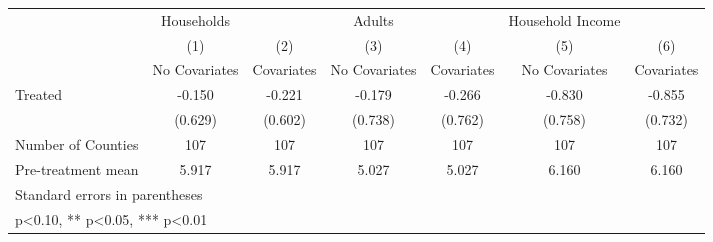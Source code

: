{
\def\sym#1{\ifmmode^{#1}\else\(^{#1}\)\fi}
\begin{tabular}{l*{6}{c}}
\hline\hline
            &  Households   &               &      Adults   &               &Household Income   &               \\
            &\multicolumn{1}{c}{(1)}&\multicolumn{1}{c}{(2)}&\multicolumn{1}{c}{(3)}&\multicolumn{1}{c}{(4)}&\multicolumn{1}{c}{(5)}&\multicolumn{1}{c}{(6)}\\
            &\multicolumn{1}{c}{No Covariates}&\multicolumn{1}{c}{Covariates}&\multicolumn{1}{c}{No Covariates}&\multicolumn{1}{c}{Covariates}&\multicolumn{1}{c}{No Covariates}&\multicolumn{1}{c}{Covariates}\\
\hline
Treated     &      -0.150   &      -0.221   &      -0.179   &      -0.266   &      -0.830   &      -0.855   \\
            &     (0.629)   &     (0.602)   &     (0.738)   &     (0.762)   &     (0.758)   &     (0.732)   \\
\hline
Number of Counties&         107   &         107   &         107   &         107   &         107   &         107   \\
Pre-treatment mean&       5.917   &       5.917   &       5.027   &       5.027   &       6.160   &       6.160   \\
\hline\hline
\multicolumn{7}{l}{\footnotesize Standard errors in parentheses}\\
\multicolumn{7}{l}{\footnotesize * p<0.10, ** p<0.05, *** p<0.01}\\
\end{tabular}
}
